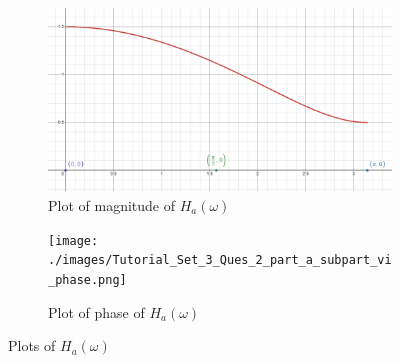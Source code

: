\documentclass{article}
\begin{document}
\begin{enumerate}
\begin{enumerate}
\begin{enumerate}
                \begin{figure}[h!]
    \centering
    \begin{subfigure}[b]{0.45\linewidth}
        \centering
        \includegraphics[width=\linewidth]{./images/Tutorial_Set_3_Ques_2_part_a_subpart_vi_magnitude.png}
        \caption{Plot of magnitude of $H_a(\omega)$}
        \label{fig:magnitude_ha}
    \end{subfigure}
    \hfill
    \begin{subfigure}[b]{0.45\linewidth}
        \centering
        \texttt{[image: ./images/Tutorial\_Set\_3\_Ques\_2\_part\_a\_subpart\_vi\_phase.png]}
        \caption{Plot of phase of $H_a(\omega)$}
        \label{fig:phase_ha}
    \end{subfigure}
    \caption{Plots of $H_a(\omega)$}
    \label{fig:ha_omega}
\end{figure}
        \end{enumerate}




\end{enumerate}
\end{enumerate}
\end{document}
